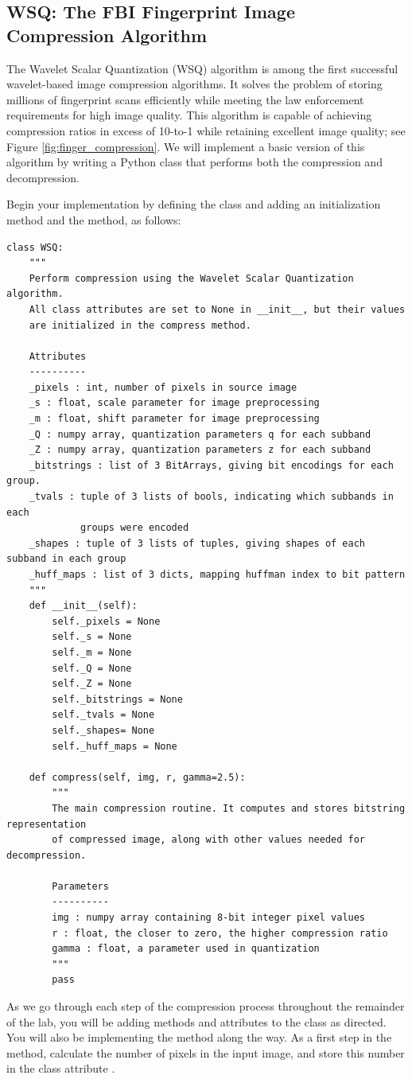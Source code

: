 \subsection*{WSQ: The FBI Fingerprint Image Compression Algorithm}
The Wavelet Scalar Quantization (WSQ) algorithm is among the first successful wavelet-based image compression algorithms.
It solves the problem of storing millions of fingerprint scans efficiently while meeting the law enforcement requirements for high image quality.
This algorithm is capable of achieving compression ratios in excess of 10-to-1 while retaining excellent image quality;
see Figure \ref{fig:finger_compression}.
We will implement a basic version of this algorithm by writing a Python class that performs both the compression and decompression.
\begin{problem}
Begin your implementation by defining the class  and adding an initialization method and the 
method, as follows:
\begin{lstlisting}
class WSQ:
    """
    Perform compression using the Wavelet Scalar Quantization algorithm.
    All class attributes are set to None in __init__, but their values
    are initialized in the compress method.

    Attributes
    ----------
    _pixels : int, number of pixels in source image
    _s : float, scale parameter for image preprocessing
    _m : float, shift parameter for image preprocessing
    _Q : numpy array, quantization parameters q for each subband
    _Z : numpy array, quantization parameters z for each subband
    _bitstrings : list of 3 BitArrays, giving bit encodings for each group.
    _tvals : tuple of 3 lists of bools, indicating which subbands in each
             groups were encoded
    _shapes : tuple of 3 lists of tuples, giving shapes of each subband in each group
    _huff_maps : list of 3 dicts, mapping huffman index to bit pattern
    """
    def __init__(self):
        self._pixels = None
        self._s = None
        self._m = None
        self._Q = None
        self._Z = None
        self._bitstrings = None
        self._tvals = None
        self._shapes= None
        self._huff_maps = None

    def compress(self, img, r, gamma=2.5):
        """
        The main compression routine. It computes and stores bitstring representation
        of compressed image, along with other values needed for decompression.

        Parameters
        ----------
        img : numpy array containing 8-bit integer pixel values
        r : float, the closer to zero, the higher compression ratio
        gamma : float, a parameter used in quantization
        """
        pass
\end{lstlisting}
As we go through each step of the compression process throughout the remainder of the lab,
you will be adding methods and attributes to the class as directed.
You will also be implementing the  method along the way.
As a first step in the  method, calculate the number of pixels
in the input image, and store this number in the class attribute .
\end{problem}


